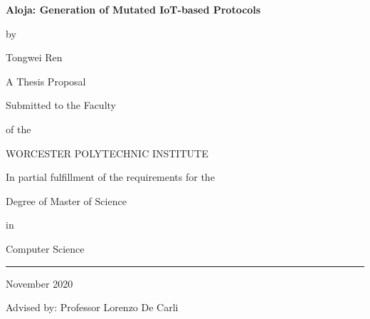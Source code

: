 \documentclass[12pt]{article}
\begin{document}
%


%
\newcommand{\brk}{\vspace*{0.18in}}

\thispagestyle{empty}

\begin{center}

\brk


   {\large 
  \textbf{
   Aloja: Generation of Mutated IoT-based Protocols 
  }
   }


\brk
by

\brk
Tongwei Ren


\brk\brk
A Thesis Proposal

\brk
Submitted to the Faculty

\brk
of the 

\brk
WORCESTER POLYTECHNIC INSTITUTE
  
\brk
In partial fulfillment of the requirements for the

\brk
Degree of Master of Science

\brk
in

\brk
Computer Science

\brk



\brk\brk
\rule{3in}{1.2pt}

\brk
November 2020

\end{center}

  
\vfill
\begin{center}
Advised by: Professor Lorenzo De Carli
\end{center}

\vspace{0.35in}
\end{document}
